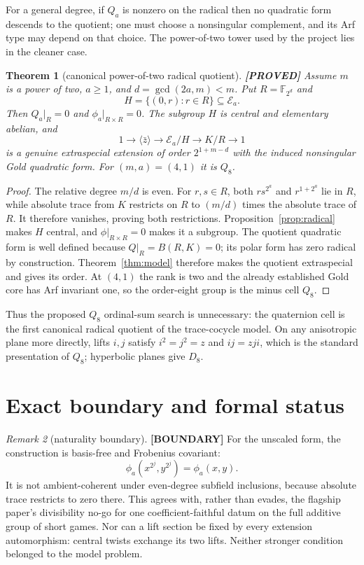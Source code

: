 \documentclass[11pt]{article}
\newtheorem{theorem}{Theorem}
\theoremstyle{definition}
\theoremstyle{remark}
\newtheorem{remark}[theorem]{Remark}
\newcommand{\F}{\mathbb{F}}
\newcommand{\taglabel}[1]{\textnormal{\textbf{[#1]}}}
\newcommand{\PROVED}{\taglabel{PROVED}}
\newcommand{\BOUNDARY}{\taglabel{BOUNDARY}}
\begin{document}
For a general degree, if $Q_a$ is nonzero on the radical then no quadratic
form descends to the quotient; one must choose a nonsingular complement,
and its Arf type may depend on that choice.  The power-of-two tower used by
the project lies in the cleaner case.

\begin{theorem}[canonical power-of-two radical quotient]\label{thm:quotient}
\PROVED{}
Assume $m$ is a power of two, $a\geq1$, and
$d=\gcd(2a,m)<m$.  Put $R=\F_{2^d}$ and
\[
 H=\{(0,r):r\in R\}\subseteq\mathcal E_a.
\]
Then $Q_a|_R=0$ and $\phi_a|_{R\times R}=0$.  The subgroup $H$ is central
and elementary abelian, and
\[
 1\longrightarrow\langle\bar z\rangle\longrightarrow
 \mathcal E_a/H\longrightarrow K/R\longrightarrow1
\]
is a genuine extraspecial extension of order $2^{1+m-d}$ with the induced
nonsingular Gold quadratic form.  For $(m,a)=(4,1)$ it is $Q_8$.
\end{theorem}

\begin{proof}
The relative degree $m/d$ is even.  For $r,s\in R$, both
$rs^{2^a}$ and $r^{1+2^a}$ lie in $R$, while absolute trace from $K$
restricts on $R$ to $(m/d)$ times the absolute trace of $R$.  It therefore
vanishes, proving both restrictions.  Proposition~\ref{prop:radical}
makes $H$ central, and $\phi|_{R\times R}=0$ makes it a subgroup.  The
quotient quadratic form is well defined because $Q|_R=B(R,K)=0$; its
polar form has zero radical by construction.  Theorem~\ref{thm:model}
therefore makes the quotient extraspecial and gives its order.  At
$(4,1)$ the rank is two and the already established Gold core has Arf
invariant one, so the order-eight group is the minus cell $Q_8$.
\end{proof}

Thus the proposed $Q_8$ ordinal-sum search is unnecessary: the quaternion
cell is the first canonical radical quotient of the trace-cocycle model.
On any anisotropic plane more directly, lifts $i,j$ satisfy
$i^2=j^2=z$ and $ij=zji$, which is the standard presentation of $Q_8$;
hyperbolic planes give $D_8$.

\section{Exact boundary and formal status}

\begin{remark}[naturality boundary]
\BOUNDARY{}
For the unscaled form, the construction is basis-free and Frobenius
covariant:
\[
 \phi_a(x^{2^j},y^{2^j})=\phi_a(x,y).
\]
It is not ambient-coherent under even-degree subfield inclusions, because
absolute trace restricts to zero there.  This agrees with, rather than
evades, the flagship paper's divisibility no-go for one coefficient-faithful
datum on the full additive group of short games.  Nor can a lift section
be fixed by every extension automorphism: central twists exchange its two
lifts.  Neither stronger condition belonged to the model problem.
\end{remark}
\end{document}
